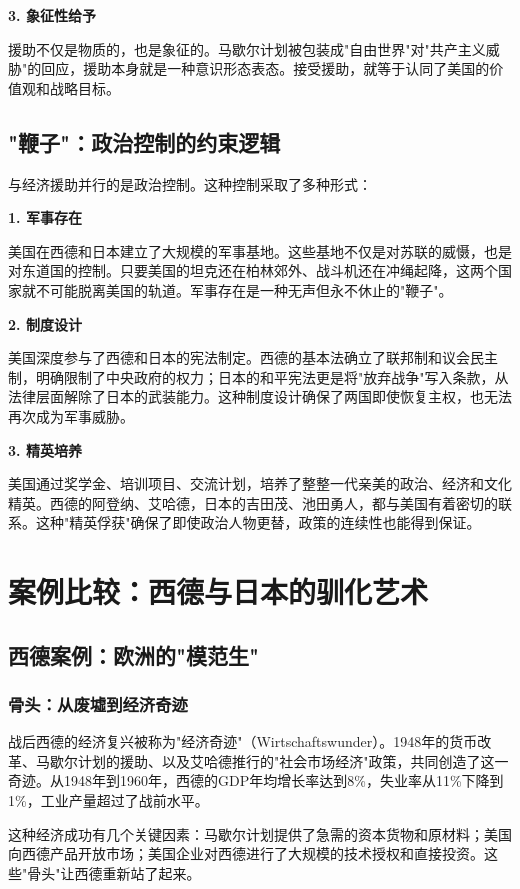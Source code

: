 \documentclass[12pt,a4paper]{article}
\begin{document}
\textbf{3. 象征性给予}

援助不仅是物质的，也是象征的。马歇尔计划被包装成"自由世界"对"共产主义威胁"的回应，援助本身就是一种意识形态表态。接受援助，就等于认同了美国的价值观和战略目标。

\subsection{"鞭子"：政治控制的约束逻辑}

与经济援助并行的是政治控制。这种控制采取了多种形式：

\textbf{1. 军事存在}

美国在西德和日本建立了大规模的军事基地。这些基地不仅是对苏联的威慑，也是对东道国的控制。只要美国的坦克还在柏林郊外、战斗机还在冲绳起降，这两个国家就不可能脱离美国的轨道。军事存在是一种无声但永不休止的"鞭子"。

\textbf{2. 制度设计}

美国深度参与了西德和日本的宪法制定。西德的基本法确立了联邦制和议会民主制，明确限制了中央政府的权力；日本的和平宪法更是将"放弃战争"写入条款，从法律层面解除了日本的武装能力。这种制度设计确保了两国即使恢复主权，也无法再次成为军事威胁。

\textbf{3. 精英培养}

美国通过奖学金、培训项目、交流计划，培养了整整一代亲美的政治、经济和文化精英。西德的阿登纳、艾哈德，日本的吉田茂、池田勇人，都与美国有着密切的联系。这种"精英俘获"确保了即使政治人物更替，政策的连续性也能得到保证。

\section{案例比较：西德与日本的驯化艺术}

\subsection{西德案例：欧洲的"模范生"}

\subsubsection{骨头：从废墟到经济奇迹}

战后西德的经济复兴被称为"经济奇迹"（Wirtschaftswunder）。1948年的货币改革、马歇尔计划的援助、以及艾哈德推行的"社会市场经济"政策，共同创造了这一奇迹。从1948年到1960年，西德的GDP年均增长率达到8\%，失业率从11\%下降到1\%，工业产量超过了战前水平。

这种经济成功有几个关键因素：马歇尔计划提供了急需的资本货物和原材料；美国向西德产品开放市场；美国企业对西德进行了大规模的技术授权和直接投资。这些"骨头"让西德重新站了起来。
\end{document}
